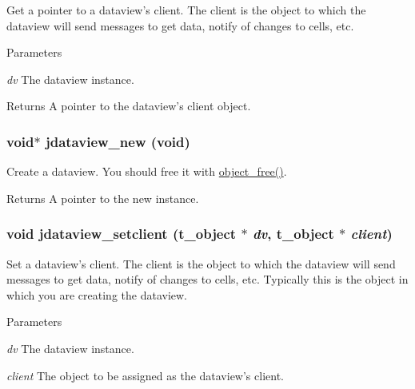 Get a pointer to a dataview's client. The client is the object to which the dataview will send messages to get data, notify of changes to cells, etc.


\begin{DoxyParams}{Parameters}
\item[{\em dv}]The dataview instance. \end{DoxyParams}
\begin{DoxyReturn}{Returns}
A pointer to the dataview's client object. 
\end{DoxyReturn}
\hypertarget{group__jdataview_gade6216b46327a12840074dae041c7060}{
\subsubsection[{jdataview\_\-new}]{\setlength{\rightskip}{0pt plus 5cm}void$\ast$ jdataview\_\-new (void)}}
\label{group__jdataview_gade6216b46327a12840074dae041c7060}


Create a dataview. You should free it with \hyperlink{group__obj_ga3759846cb356195532c41e35b87522ee}{object\_\-free()}.

\begin{DoxyReturn}{Returns}
A pointer to the new instance. 
\end{DoxyReturn}
\hypertarget{group__jdataview_ga830dcb9370db2643336d5a0fe91fae7e}{
\subsubsection[{jdataview\_\-setclient}]{\setlength{\rightskip}{0pt plus 5cm}void jdataview\_\-setclient ({\bf t\_\-object} $\ast$ {\em dv}, \/  {\bf t\_\-object} $\ast$ {\em client})}}
\label{group__jdataview_ga830dcb9370db2643336d5a0fe91fae7e}


Set a dataview's client. The client is the object to which the dataview will send messages to get data, notify of changes to cells, etc. Typically this is the object in which you are creating the dataview.


\begin{DoxyParams}{Parameters}
\item[{\em dv}]The dataview instance. \item[{\em client}]The object to be assigned as the dataview's client. \end{DoxyParams}
